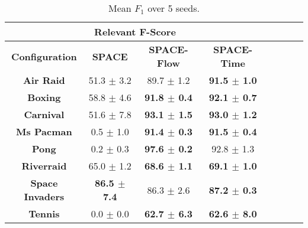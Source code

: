 \begin{table}[h]
\centering
\begin{tabular}{|c||c|c|c|c|c|c|c|}
\hline
\multicolumn{4}{|c|}{\textbf{Relevant F-Score}} \\
\hline
\hhline{|====|}
\textbf{Configuration} & \textbf{SPACE} & \textbf{SPACE-Flow} & \textbf{SPACE-Time} \\
\hline
\textbf{Air Raid} & 51.3 $\pm$ 3.2 & 89.7 $\pm$ 1.2 & \textbf{91.5 $\pm$ 1.0} \\
\textbf{Boxing} & 58.8 $\pm$ 4.6 & \textbf{91.8 $\pm$ 0.4} & \textbf{92.1 $\pm$ 0.7} \\
\textbf{Carnival} & 51.6 $\pm$ 7.8 & \textbf{93.1 $\pm$ 1.5} & \textbf{93.0 $\pm$ 1.2} \\
\textbf{Ms Pacman} & 0.5 $\pm$ 1.0 & \textbf{91.4 $\pm$ 0.3} & \textbf{91.5 $\pm$ 0.4} \\
\textbf{Pong} & 0.2 $\pm$ 0.3 & \textbf{97.6 $\pm$ 0.2} & 92.8 $\pm$ 1.3 \\
\textbf{Riverraid} & 65.0 $\pm$ 1.2 & \textbf{68.6 $\pm$ 1.1} & \textbf{69.1 $\pm$ 1.0} \\
\textbf{Space Invaders} & \textbf{86.5 $\pm$ 7.4} & 86.3 $\pm$ 2.6 & \textbf{87.2 $\pm$ 0.3} \\
\textbf{Tennis} & 0.0 $\pm$ 0.0 & \textbf{62.7 $\pm$ 6.3} & \textbf{62.6 $\pm$ 8.0} \\
\hline
\end{tabular}
\caption{Mean $F_1$ over 5 seeds.}
\label{table:relevant_f_score}
\end{table}